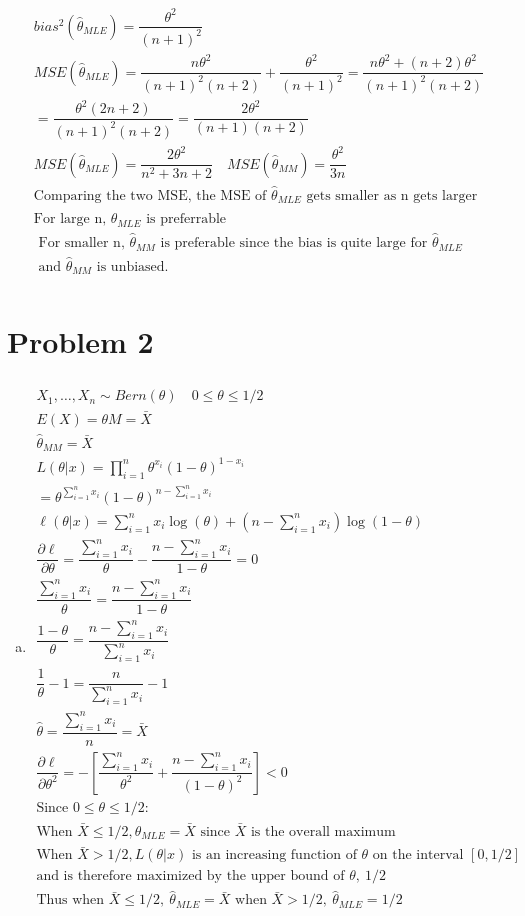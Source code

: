 \documentclass{article}
\newcommand{\sumn}{\sum_{i=1}^{n}}
\newcommand{\hth}{\hat{\theta}}
\newcommand{\prodn}{\prod_{i=1}^{n}}
\newcommand{\dll}[1]{\dfrac{\partial\ell}{\partial{#1}}}
\newcommand{\mle}{\hat{\theta}_{MLE}}
\newcommand{\mm}{\hat{\theta}_{MM}}
\newcommand{\sumx}{\sum_{i=1}^{n}x_i}
\begin{document}
\begin{flushleft}
\begin{multline*}
bias^2(\mle)=\dfrac{\theta^2}{(n+1)^2}\\
MSE(\mle)=\dfrac{n\theta^2}{(n+1)^2(n+2)}+\dfrac{\theta^2}{(n+1)^2}=\dfrac{n\theta^2+(n+2)\theta^2}{(n+1)^2(n+2)}\\
=\dfrac{\theta^2(2n+2)}{(n+1)^2(n+2)}=\dfrac{2\theta^2}{(n+1)(n+2)}\\
MSE(\mle)=\dfrac{2\theta^2}{n^2+3n+2} \quad MSE(\mm)=\dfrac{\theta^2}{3n}\\
\text{Comparing the two MSE, the MSE of } \mle
\text{ gets smaller as n gets larger}\\
\text{For large n, } \mle \text{ is preferrable}\\
\text{ For smaller n, } \mm \text{ is preferable since the bias is quite large for } \mle\\
\text{ and } \mm \text{ is unbiased.}\\
\end{multline*}

	\section*{Problem 2}
\begin{enumerate}[(a)]
	
	\item 
\begin{multline*}\\
X_1,\dots,X_n \sim Bern(\theta) \quad 0\leq \theta \leq 1/2\\
E(X)=\theta M=\bar{X}\\
\hat{\theta}_{MM}=\bar{X}\\
L(\theta|x)=\prodn \theta^{x_i}(1-\theta)^{1-x_i}\\
=\theta^{\sumn x_i}(1-\theta)^{n-\sumn x_i}\\
\ell(\theta|x)=\sumn x_i\log(\theta)+(n-\sumn x_i)\log(1-\theta)\\
\dll{\theta}=\dfrac{\sumn x_i}{\theta}-\dfrac{n-\sumn x_i}{1-\theta}=0\\
\dfrac{\sumn x_i}{\theta}=\dfrac{n-\sumn x_i}{1-\theta}\\
\dfrac{1-\theta}{\theta}=\dfrac{n-\sumn x_i}{\sumn x_i}\\
\dfrac{1}{\theta}-1=\dfrac{n}{\sumn x_i}-1\\
\hth=\dfrac{\sumx}{n}=\bar{X}\\
\dll{\theta^2}=-\left[\dfrac{\sumn x_i}{\theta^2}+\dfrac{n-\sumn x_i}{(1-\theta)^2}\right]<0\\
\text{Since } 0\leq \theta \leq 1/2:\\
\text{When } \bar{X}\leq 1/2, \mle=\bar{X} \text{ since } \bar{X} \text{ is the overall maximum}\\
\text{When } \bar{X}>1/2, L(\theta|x) \text{ is an increasing function of } \theta \text{ on the interval } [0,1/2]\\
\text{and is therefore maximized by the upper bound of } \theta, \ 1/2\\
\text{Thus when } \bar{X}\leq 1/2, \ \mle=\bar{X} \text{ when } \bar{X}>1/2, \ \mle=1/2\\
\end{multline*}


\end{enumerate}
\end{flushleft}
\end{document}
